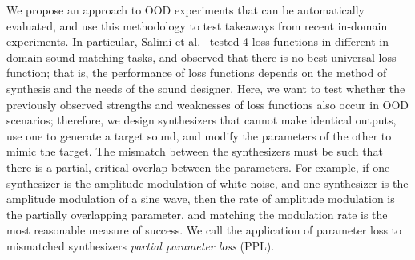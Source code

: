 \documentclass{article}
\newcommand{\anon}[1]{{#1}}
\begin{document}
We propose an approach to OOD experiments that can be automatically evaluated, and use this methodology to test takeaways from recent in-domain experiments. In particular, \anon{Salimi et al.}~\cite{salimi2025evaluating} tested 4 loss functions in different in-domain sound-matching tasks, and observed that there is no best universal loss function; that is, the performance of loss functions depends on the method of synthesis and the needs of the sound designer. Here, we want to test whether the previously observed strengths and weaknesses of loss functions also occur in OOD scenarios; therefore, we design synthesizers that cannot make identical outputs, use one to generate a target sound, and modify the parameters of the other to mimic the target. The mismatch between the synthesizers must be such that there is a partial, critical overlap between the parameters. For example, if one synthesizer is the amplitude modulation of white noise, and one synthesizer is the amplitude modulation of a sine wave, then the rate of amplitude modulation is the partially overlapping parameter, and matching the modulation rate is the most reasonable measure of success. We call the application of parameter loss to mismatched synthesizers \textit{partial parameter loss} (PPL). 





\end{document}
